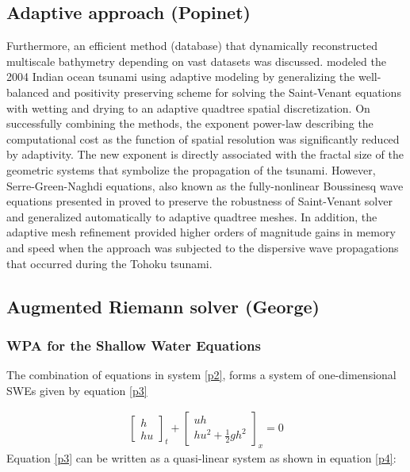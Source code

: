 \documentclass[10pt,a4paper]{article}
\begin{document}
	\subsection{Adaptive approach (Popinet)}
Furthermore, an efficient method (database) that dynamically reconstructed multiscale bathymetry depending on vast datasets was discussed. \citet{popinet2011quadtree} modeled the 2004 Indian ocean tsunami using adaptive modeling by generalizing the \citet{audusse2004fast} well-balanced and positivity preserving scheme for solving the Saint-Venant equations with wetting and drying to an adaptive quadtree spatial discretization. On successfully combining the methods, the exponent power-law describing the computational cost as the function of spatial resolution was significantly reduced by adaptivity. The new exponent is directly associated with the fractal size of the geometric systems that symbolize the propagation of the tsunami. However, Serre-Green-Naghdi equations, also known as the fully-nonlinear Boussinesq wave equations presented in \citet{popinet2015quadtree} proved to preserve the robustness of Saint-Venant solver and generalized automatically to adaptive quadtree meshes.  In addition, the adaptive mesh refinement provided higher orders of magnitude gains in memory and speed when the approach was subjected to the dispersive wave propagations that occurred during the Tohoku tsunami.


	\subsection{Augmented Riemann solver (George)}

	\subsubsection{WPA for the Shallow Water Equations}
	The combination of equations in system \eqref{p2}, forms a system of one-dimensional SWEs given by equation \eqref{p3}
	
	\begin{eqnarray}
		\begin{bmatrix} h \\ hu \end{bmatrix}_t + \begin{bmatrix} uh \\ hu^{2} + \frac{1}{2} gh^{2} \end{bmatrix}_x  = 0 
		\label{p3}
	\end{eqnarray}
	Equation \eqref{p3} can be written as a quasi-linear system as shown in equation \eqref{p4}:
	
\end{document}
